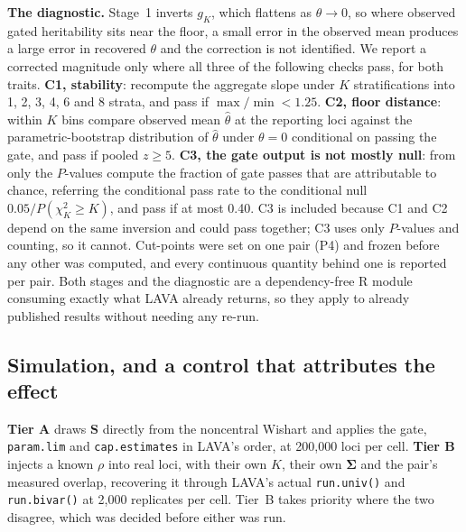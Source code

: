 \documentclass[12pt,a4paper]{article}
\newcommand{\Sig}{\bm{\Sigma}}
\begin{document}
\medskip
\noindent\textbf{The diagnostic.} Stage~1 inverts $g_K$, which flattens as $\theta\to0$,
so where observed gated heritability sits near the floor, a small error in the observed
mean produces a large error in recovered $\theta$ and the correction is not identified.
We report a corrected magnitude only where all three of the following checks pass, for both
traits. \textbf{C1, stability}: recompute the aggregate slope under $K$
stratifications into 1, 2, 3, 4, 6 and 8 strata, and pass if $\max/\min<1.25$. \textbf{C2,
floor distance}: within $K$ bins compare observed mean $\hat\theta$ at the reporting loci
against the parametric-bootstrap distribution of $\hat\theta$ under $\theta=0$ conditional
on passing the gate, and pass if pooled $z\ge5$. \textbf{C3, the gate output is not mostly
null}: from only the $P$-values compute the fraction of gate passes that are attributable
to chance, referring the conditional pass rate to the conditional null
$0.05/P(\chi^2_K\ge K)$, and pass if at most 0.40. C3 is included because C1 and C2 depend
on the same inversion and could pass together; C3 uses only
$P$-values and counting, so it cannot. Cut-points were set on one pair (P4) and frozen
before any other was computed, and every continuous
quantity behind one is reported per pair. Both stages and the diagnostic are a
dependency-free R module consuming exactly what LAVA already returns, so they apply to
already published results without needing any re-run.

\subsection{Simulation, and a control that attributes the effect}\label{sec:tiers}

\textbf{Tier A} draws $\bm{S}$ directly from the noncentral Wishart and applies the gate,
\texttt{param.lim} and \texttt{cap.estimates} in LAVA's order, at 200,000 loci per cell.
\textbf{Tier B} injects a known $\rho$ into real loci, with their own $K$, their own
$\Sig$ and the pair's measured overlap, recovering it through LAVA's actual
\texttt{run.univ()} and \texttt{run.bivar()} at 2,000 replicates per cell. Tier~B takes
priority where the two disagree, which was decided before either was run.
\end{document}
